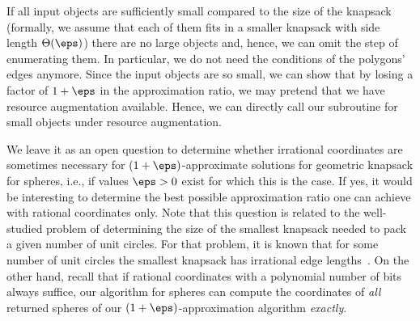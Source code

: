 \documentclass[10pt,a4paper]{article}
\theoremstyle{plain}
\theoremstyle{plain}
\theoremstyle{plain}
\theoremstyle{definition}
\begin{document}
{If all input objects are sufficiently small compared to the size of the knapsack (formally, we assume that each of them
fits in a smaller knapsack with side length $\Theta(\eps)$)
there are no large objects and, hence,
we can omit the step of enumerating them. In particular, we do not
need the conditions of the polygons' edges anymore.
Since the input objects are so small,
we can show that by losing a factor of $1+\eps$ in the approximation ratio,
we may pretend that we have resource augmentation available.
Hence, we can directly call our subroutine for small objects under resource augmentation.

We leave it as an open question to determine whether irrational coordinates
are sometimes necessary for $(1+\eps)$-approximate 
solutions for geometric knapsack for spheres, i.e., if values $\eps>0$ exist for which this is the case.
If yes, it would be
interesting to determine the best possible approximation ratio one
can achieve with rational coordinates only. Note that this question
is related to the well-studied problem of determining the size of
the smallest knapsack needed to pack a given number of unit circles.
For that problem, it is known that for some number of unit circles
the smallest knapsack has irrational edge lengths~\cite{friedman-cirinsqu}.
On the other hand, recall that if rational coordinates with a polynomial number of bits
always suffice, our algorithm for spheres can compute the coordinates
of \emph{all} returned spheres of our $(1+\eps)$-approximation algorithm
\emph{exactly}.

}
\end{document}
